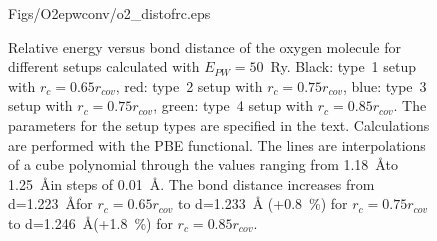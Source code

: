 \documentclass[11pt,a4paper]{report}
\begin{document}
\begin{figure}[h!]
\begin{center}
        {Figs/O2epwconv/o2_distofrc.eps}
\end{center}
\caption{\label{o2_dist}Relative energy versus bond distance of the
  oxygen molecule for different setups calculated with
  $E_{PW}=50$~Ry. Black: type~1 setup with $r_c=0.65 r_{cov}$, red:
  type~2 setup with $r_c=0.75 r_{cov}$, blue: type~3 setup with
  $r_c=0.75 r_{cov}$, green: type~4 setup with $r_c=0.85 r_{cov}$. The
  parameters for the setup types are specified in the
  text. Calculations are performed with the PBE functional. The lines
  are interpolations of a cube polynomial through the values ranging
  from 1.18~\AA to 1.25~\AA in steps of 0.01~\AA. The bond distance
  increases from d=1.223~\AA for $r_c=0.65 r_{cov}$ to d=1.233~\AA
  (+0.8~\%) for $r_c=0.75 r_{cov}$ to d=1.246~\AA (+1.8~\%) for
  $r_c=0.85 r_{cov}$.}
\end{figure}
\end{document}
